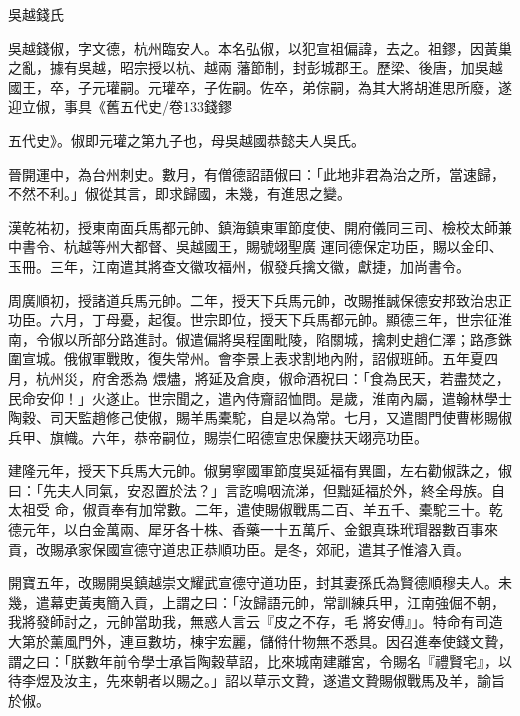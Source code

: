 
\begin{pinyinscope}

 吳越錢氏



 吳越錢俶，字文德，杭州臨安人。本名弘俶，以犯宣祖偏諱，去之。祖鏐，因黃巢之亂，據有吳越，昭宗授以杭、越兩
 藩節制，封彭城郡王。歷梁、後唐，加吳越國王，卒，子元瓘嗣。元瓘卒，子佐嗣。佐卒，弟倧嗣，為其大將胡進思所廢，遂迎立俶，事具《舊五代史/卷133錢鏐
 
 五代史》。俶即元瓘之第九子也，母吳越國恭懿夫人吳氏。



 晉開運中，為台州刺史。數月，有僧德詔語俶曰：「此地非君為治之所，當速歸，不然不利。」俶從其言，即求歸國，未幾，有進思之變。



 漢乾祐初，授東南面兵馬都元帥、鎮海鎮東軍節度使、開府儀同三司、檢校太師兼中書令、杭越等州大都督、吳越國王，賜號翊聖廣
 運同德保定功臣，賜以金印、玉冊。三年，江南遣其將查文徽攻福州，俶發兵擒文徽，獻捷，加尚書令。



 周廣順初，授諸道兵馬元帥。二年，授天下兵馬元帥，改賜推誠保德安邦致治忠正功臣。六月，丁母憂，起復。世宗即位，授天下兵馬都元帥。顯德三年，世宗征淮南，令俶以所部分路進討。俶遣偏將吳程圍毗陵，陷關城，擒刺史趙仁澤；路彥銖圍宣城。俄俶軍戰敗，復失常州。會李景上表求割地內附，詔俶班師。五年夏四月，杭州災，府舍悉為
 煨燼，將延及倉庾，俶命酒祝曰：「食為民天，若盡焚之，民命安仰！」火遂止。世宗聞之，遣內侍齎詔恤問。是歲，淮南內屬，遣翰林學士陶穀、司天監趙修己使俶，賜羊馬橐駝，自是以為常。七月，又遣閤門使曹彬賜俶兵甲、旗幟。六年，恭帝嗣位，賜崇仁昭德宣忠保慶扶天翊亮功臣。



 建隆元年，授天下兵馬大元帥。俶舅寧國軍節度吳延福有異圖，左右勸俶誅之，俶曰：「先夫人同氣，安忍置於法？」言訖鳴咽流涕，但黜延福於外，終全母族。自太祖受
 命，俶貢奉有加常數。二年，遣使賜俶戰馬二百、羊五千、橐駝三十。乾德元年，以白金萬兩、犀牙各十株、香藥一十五萬斤、金銀真珠玳瑁器數百事來貢，改賜承家保國宣德守道忠正恭順功臣。是冬，郊祀，遣其子惟濬入貢。



 開寶五年，改賜開吳鎮越崇文耀武宣德守道功臣，封其妻孫氏為賢德順穆夫人。未幾，遣幕吏黃夷簡入貢，上謂之曰：「汝歸語元帥，常訓練兵甲，江南強倔不朝，我將發師討之，元帥當助我，無惑人言云『皮之不存，毛
 將安傅』」。特命有司造大第於薰風門外，連亘數坊，棟宇宏麗，儲偫什物無不悉具。因召進奉使錢文贄，謂之曰：「朕數年前令學士承旨陶穀草詔，比來城南建離宮，令賜名『禮賢宅』，以待李煜及汝主，先來朝者以賜之。」詔以草示文贄，遂遣文贄賜俶戰馬及羊，諭旨於俶。




\end{pinyinscope}
